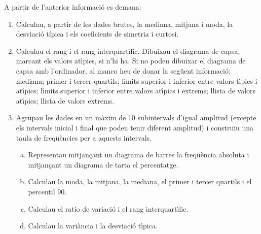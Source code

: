 \documentclass[11pt]{article}
\begin{document}
A partir de l'anterior informaci\'o es demana:

\begin{enumerate}[1-]
\item  Calculau, a partir de les dades brutes, la mediana, mitjana i moda, la desviaci\'o t\'ipica i els coeficients de simetria i curtosi.

\item Calculau el rang i el rang interquart\'{\i}lic. Dibuixau el diagrama de capsa, marcant els valors at\'{\i}pics, si n'hi ha. 
Si no podeu dibuixar el diagrama de capsa amb l'ordinador, al manco heu de donar la seg\"uent informaci\'o: mediana; primer i tercer quartils; l\'\i mits
superior i inferior entre valors t\'\i pics i at\'\i pics; l\'\i mits superior i inferior entre valors at\'\i pics i extrems; llista de valors
at\'\i pics; llista de valors extrems.


\item  Agrupau les dades en un m\`axim de 10 subintervals d'igual amplitud (excepte els intervals inicial i final que poden tenir diferent amplitud)
i constru\"{\i}u una taula de freq\"u\`encies per a aquests intervals.
\begin{enumerate}[a)]
\item Representau mitjan\c{c}ant un diagrama de barres la freq\"u\`encia absoluta i mitjan\c{c}ant un diagrama de 
tarta el percentatge.
\item  Calculau la moda, la mitjana, la mediana, el primer i tercer quartils i el percentil
90.
\item  Calculau el ratio de variaci\'o i el rang interquart\'{\i}lic. 
\item  Calculau la vari\`ancia i la desviaci\'o t\'{\i}pica.
\end{enumerate}
\end{enumerate}
\end{document}
